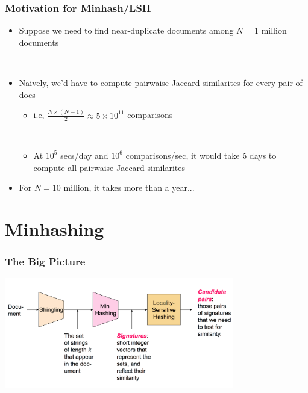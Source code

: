 \documentclass[svgnames]{beamer}
\begin{document}
\begin{frame} \frametitle{Motivation for Minhash/LSH}

\begin{itemize}
\item Suppose we need to find near-duplicate documents among $N=1$ million documents

~\\

\item Naively, we'd have to compute pairwaise Jaccard similarites for every pair of docs
\begin{itemize}
  \item i.e, $\frac{N \times (N-1)}{2} \approx 5 \times 10^{11}$ comparisons

  ~\\
  
  \item At $10^5$ secs/day and $10^6$ comparisons/sec, it would take 5 days to compute all pairwaise Jaccard similarites
\end{itemize}

\item For $N = 10$ million, it takes more than a year...
\end{itemize}
\end{frame}

\section{Minhashing}

  
\begin{frame} \frametitle{The Big Picture}
\includegraphics[width=10cm]{overall}
\end{frame}

  
\end{document}

